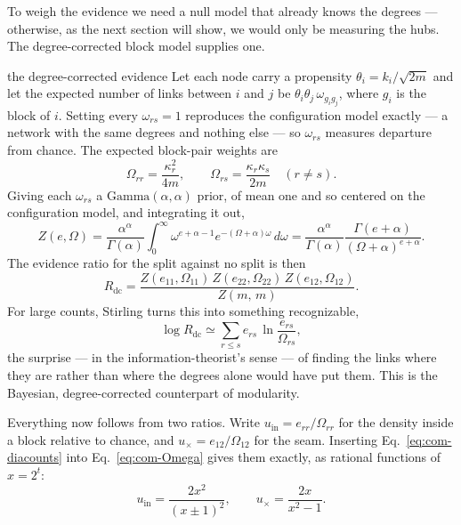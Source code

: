 To weigh the evidence we need a null model that already knows the degrees ---
otherwise, as the next section will show, we would only be measuring the hubs. The
degree-corrected block model \citep{karrer2011} supplies one.

\begin{calculation}{the degree-corrected evidence}
Let each node carry a propensity $\theta_i=k_i/\sqrt{2m}$ and let the expected
number of links between $i$ and $j$ be $\theta_i\theta_j\,\omega_{g_ig_j}$, where
$g_i$ is the block of $i$. Setting every $\omega_{rs}=1$ reproduces the
configuration model exactly --- a network with the same degrees and nothing else
--- so $\omega_{rs}$ measures departure from chance. The expected block-pair
weights are
\begin{equation}
  \Omega_{rr} = \frac{\kappa_r^2}{4m}, \qquad
  \Omega_{rs} = \frac{\kappa_r\kappa_s}{2m}\quad(r\neq s).
  \label{eq:com-Omega}
\end{equation}
Giving each $\omega_{rs}$ a $\mathrm{Gamma}(\alpha,\alpha)$ prior, of mean one and
so centered on the configuration model, and integrating it out,
\begin{equation}
  Z(e,\Omega) = \frac{\alpha^\alpha}{\Gamma(\alpha)}
  \int_0^\infty \omega^{e+\alpha-1}e^{-(\Omega+\alpha)\omega}\,d\omega
  = \frac{\alpha^\alpha}{\Gamma(\alpha)}\frac{\Gamma(e{+}\alpha)}{(\Omega{+}\alpha)^{e+\alpha}} .
  \label{eq:com-Zdc}
\end{equation}
The evidence ratio for the split against no split is then
\begin{equation}
  R_{\mathrm{dc}} = \frac{Z(e_{11},\Omega_{11})\,Z(e_{22},\Omega_{22})\,Z(e_{12},\Omega_{12})}
  {Z(m,\,m)} .
  \label{eq:com-Rdc}
\end{equation}
For large counts, Stirling turns this into something recognizable,
\begin{equation}
  \log R_{\mathrm{dc}} \simeq \sum_{r\le s} e_{rs}\,\ln\frac{e_{rs}}{\Omega_{rs}},
  \label{eq:com-KL}
\end{equation}
the surprise --- in the information-theorist's sense --- of finding the links where
they are rather than where the degrees alone would have put them. This is the
Bayesian, degree-corrected counterpart of modularity.
\end{calculation}

Everything now follows from two ratios. Write $u_{\mathrm{in}}=e_{rr}/\Omega_{rr}$
for the density inside a block relative to chance, and
$u_{\times}=e_{12}/\Omega_{12}$ for the seam. Inserting
Eq.~\eqref{eq:com-diacounts} into Eq.~\eqref{eq:com-Omega} gives them exactly, as
rational functions of $x=2^t$:
\begin{equation}
  u_{\mathrm{in}} = \frac{2x^2}{(x\pm1)^2},
  \qquad
  u_{\times} = \frac{2x}{x^2-1}.
  \label{eq:com-densities}
\end{equation}

